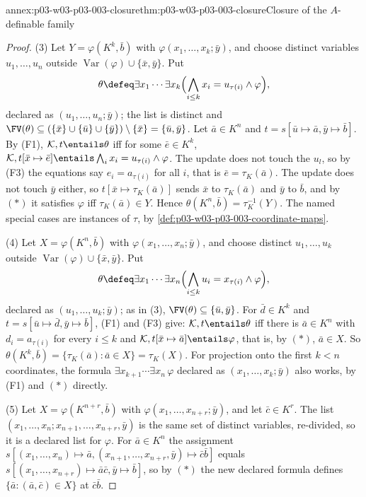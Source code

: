 \begin{annexitem}{annex:p03-w03-p03-003-closure}{thm:p03-w03-p03-003-closure}{Closure of the \(A\)-definable family}
\begin{proof}
(3) Let \(Y=\varphi(K^k,\bar b)\) with \(\varphi(x_1,\ldots,x_k;\bar y)\),
and choose distinct variables \(u_1,\ldots,u_n\) outside
\(\operatorname{Var}(\varphi)\cup\{\bar x,\bar y\}\).  Put
\[
 \theta\defeq\exists x_1\cdots\exists x_k
   \Bigl(\bigwedge_{i\leq k}x_i=u_{\tau(i)}\land\varphi\Bigr),
\]
declared as \((u_1,\ldots,u_n;\bar y)\); the list is distinct and
\(\FV(\theta)\subseteq(\{\bar x\}\cup\{\bar u\}\cup\{\bar y\})\setminus
\{\bar x\}=\{\bar u,\bar y\}\).  Let \(\bar a\in K^n\) and
\(t=s[\bar u\mapsto\bar a,\bar y\mapsto\bar b]\).  By (F1),
\(\mathcal K,t\entails\theta\) iff for some \(\bar e\in K^k\),
\(\mathcal K,t[\bar x\mapsto\bar e]\entails\bigwedge_ix_i=u_{\tau(i)}
\land\varphi\).  The update does not touch the \(u_l\), so by (F3) the
equations say \(e_i=a_{\tau(i)}\) for all \(i\), that is
\(\bar e=\tau_K(\bar a)\).  The update does not touch \(\bar y\) either, so
\(t[\bar x\mapsto\tau_K(\bar a)]\) sends \(\bar x\) to \(\tau_K(\bar a)\)
and \(\bar y\) to \(\bar b\), and by \((\ast)\) it satisfies \(\varphi\) iff
\(\tau_K(\bar a)\in Y\).  Hence
\(\theta(K^n,\bar b)=\tau_K^{-1}(Y)\).  The named special cases are
instances of \(\tau\), by \cref{def:p03-w03-p03-003-coordinate-maps}.

(4) Let \(X=\varphi(K^n,\bar b)\) with \(\varphi(x_1,\ldots,x_n;\bar y)\),
and choose distinct \(u_1,\ldots,u_k\) outside
\(\operatorname{Var}(\varphi)\cup\{\bar x,\bar y\}\).  Put
\[
 \theta\defeq\exists x_1\cdots\exists x_n
   \Bigl(\bigwedge_{i\leq k}u_i=x_{\tau(i)}\land\varphi\Bigr),
\]
declared as \((u_1,\ldots,u_k;\bar y)\); as in (3),
\(\FV(\theta)\subseteq\{\bar u,\bar y\}\).  For \(\bar d\in K^k\) and
\(t=s[\bar u\mapsto\bar d,\bar y\mapsto\bar b]\), (F1) and (F3) give:
\(\mathcal K,t\entails\theta\) iff there is \(\bar a\in K^n\) with
\(d_i=a_{\tau(i)}\) for every \(i\leq k\) and
\(\mathcal K,t[\bar x\mapsto\bar a]\entails\varphi\), that is, by \((\ast)\),
\(\bar a\in X\).  So \(\theta(K^k,\bar b)=\{\tau_K(\bar a):\bar a\in X\}
=\tau_K(X)\).  For projection onto the first \(k<n\) coordinates, the
formula \(\exists x_{k+1}\cdots\exists x_n\,\varphi\) declared as
\((x_1,\ldots,x_k;\bar y)\) also works, by (F1) and \((\ast)\) directly.

(5) Let \(X=\varphi(K^{n+r},\bar b)\) with
\(\varphi(x_1,\ldots,x_{n+r};\bar y)\), and let \(\bar c\in K^r\).  The list
\((x_1,\ldots,x_n;x_{n+1},\ldots,x_{n+r},\bar y)\) is the same set of
distinct variables, re-divided, so it is a declared list for \(\varphi\).
For \(\bar a\in K^n\) the assignment
\(s[(x_1,\ldots,x_n)\mapsto\bar a,(x_{n+1},\ldots,x_{n+r},\bar y)\mapsto
\bar c\bar b]\) equals
\(s[(x_1,\ldots,x_{n+r})\mapsto\bar a\bar c,\bar y\mapsto\bar b]\), so by
\((\ast)\) the new declared formula defines
\(\{\bar a:(\bar a,\bar c)\in X\}\) at \(\bar c\bar b\).
\end{proof}
\end{annexitem}


